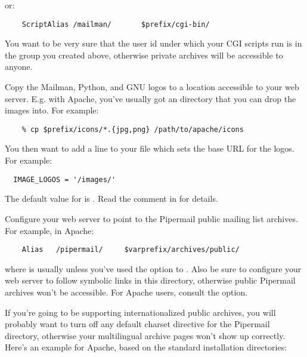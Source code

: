 \documentclass{howto}
\begin{document}
  or:

\begin{verbatim}
    ScriptAlias /mailman/       $prefix/cgi-bin/
\end{verbatim}

\begin{notice}[warning]
You want to be very sure that the user id under which your CGI scripts run is
 in the  group you created above, otherwise private
archives will be accessible to anyone.
\end{notice}

Copy the Mailman, Python, and GNU logos to a location accessible to your web
server.  E.g. with Apache, you've usually got an  directory that
you can drop the images into.  For example:

\begin{verbatim}
    % cp $prefix/icons/*.{jpg,png} /path/to/apache/icons
\end{verbatim}

You then want to add a line to your 
file which sets the base URL for the logos.  For example:

\begin{verbatim}
  IMAGE_LOGOS = '/images/'
\end{verbatim}

The default value for  is .  Read the comment
in  for details.

Configure your web server to point to the Pipermail public mailing list
archives.  For example, in Apache:

\begin{verbatim}
    Alias   /pipermail/     $varprefix/archives/public/
\end{verbatim}

where  is usually  unless you've used the
 option to .  Also be
sure to configure your web server to follow symbolic links in this directory,
otherwise public Pipermail archives won't be accessible.  For Apache users,
consult the  option.

If you're going to be supporting internationalized public archives, you will
probably want to turn off any default charset directive for the Pipermail
directory, otherwise your multilingual archive pages won't show up correctly.
Here's an example for Apache, based on the standard installation directories:
\end{document}
